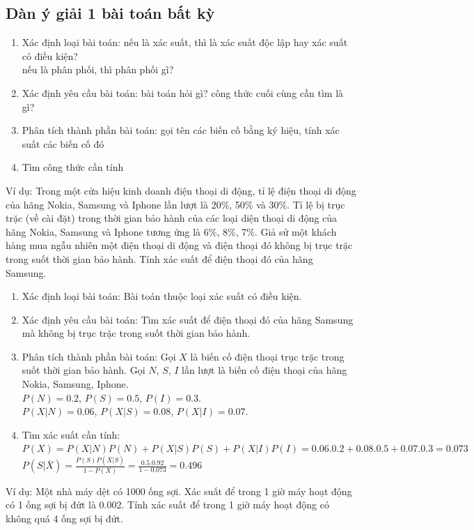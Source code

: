 \documentclass[12pt]{article}
\def\bar#1{\overline{#1}}
\begin{document}
\subsection{Dàn ý giải 1 bài toán bất kỳ}
\begin{enumerate}
    \item Xác định loại bài toán: nếu là xác suất, thì là xác suất độc lập hay xác suất có điều kiện? \\
    nếu là phân phối, thì phân phối gì?
    \item Xác định yêu cầu bài toán: bài toán hỏi gì? công thức cuối cùng cần tìm là gì?
    \item Phân tích thành phần bài toán:
    gọi tên các biến cố bằng ký hiệu, tính xác suất các biến cố đó
    \item Tìm công thức cần tính
\end{enumerate}
Ví dụ: Trong một cửa hiệu kinh doanh điện thoại di động, tỉ lệ điện
thoại di động của hãng Nokia, Samsung và Iphone lần lượt là 20\%, 50\% và 30\%. Tỉ
lệ bị trục trặc (về cài đặt) trong thời gian bảo hành của các loại diện thoại di động
của hãng Nokia, Samsung và Iphone tương ứng là 6\%, 8\%, 7\%. Giả sử một khách
hàng mua ngẫu nhiên một điện thoại di động và điện thoại đó không bị trục trặc
trong suốt thời gian bảo hành. Tính xác suất để điện thoại đó của hãng Samsung.
\begin{enumerate}
    \item Xác định loại bài toán: Bài toán thuộc loại xác suất có điều kiện.
    \item Xác định yêu cầu bài toán: Tìm xác suất để điện thoại đó của hãng Samsung mà không bị trục trặc trong suốt thời gian bảo hành.
    \item Phân tích thành phần bài toán:
    \subitem Gọi $X$ là biến cố điện thoại trục trặc trong suốt thời gian bảo hành.
    \subitem Gọi $N$, $S$, $I$ lần lượt là biến cố điện thoại của hãng Nokia, Samsung, Iphone. \\ $P(N) = 0.2$, $P(S) = 0.5$, $P(I) = 0.3$.
    \\ $P(X|N) = 0.06$, $P(X|S) = 0.08$, $P(X|I) = 0.07$.
    \item Tìm xác suất cần tính: \\
    $P(X) = P(X|N)P(N) + P(X|S)P(S) + P(X|I)P(I) = 0.06 . 0.2 + 0.08 . 0.5 + 0.07 . 0.3 = 0.073$ \\
    $P(S|\bar{X}) = \frac{P(S)P(\bar{X}|S)}{1-P(X)} = \frac{0.5 . 0.92}{1-0.073} = 0.496$

\end{enumerate}
Ví dụ: Một nhà máy dệt có 1000 ống sợi. Xác suất để trong 1 giờ máy
hoạt động có 1 ống sợi bị đứt là 0.002. Tính xác suất để trong 1 giờ máy hoạt động
có không quá 4 ống sợi bị đứt.
\end{document}

